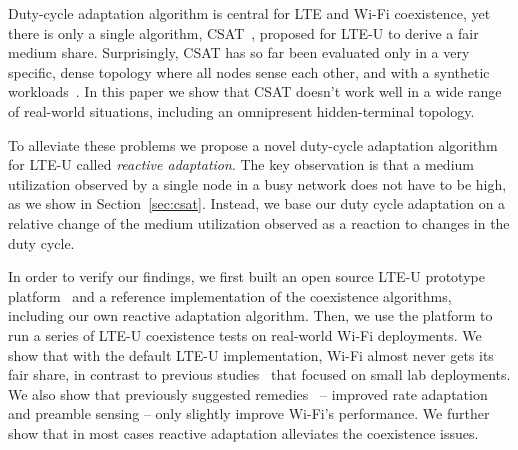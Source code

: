 Duty-cycle adaptation algorithm is central for LTE and Wi-Fi coexistence, yet there is only a single algorithm, CSAT~\cite{lteuforum_csat}, proposed for LTE-U to derive a fair medium share.
Surprisingly, CSAT has so far been evaluated only in a very specific, dense topology where all nodes sense each other, and with a synthetic workloads~\cite{qualcommpresentation}. In this paper we show that CSAT doesn't work well in a wide range of real-world situations, including an omnipresent hidden-terminal topology. 

To alleviate these problems we propose a novel duty-cycle adaptation algorithm for LTE-U called {\em reactive adaptation}. The key observation is that a medium utilization observed by a single node in a busy network does not have to be high, as we show in Section~\ref{sec:csat}. Instead, we base our duty cycle adaptation on a relative change of the medium utilization observed as a reaction to changes in the duty cycle. 

In order to verify our findings, we first built an open source LTE-U prototype platform~\cite{OpenLTEU} and a reference implementation of the coexistence algorithms, including our own reactive adaptation algorithm. 
Then, we use the platform to run a series of LTE-U coexistence tests on real-world Wi-Fi deployments. 
We show that with the default LTE-U implementation, Wi-Fi almost never gets its fair share, in contrast to previous studies~\cite{qualcommpresentation} that focused on small lab deployments. 
We also show that previously suggested remedies~\cite{google, cablelabs} -- improved rate adaptation and preamble sensing -- only slightly improve Wi-Fi's performance. 
We further show that in most cases reactive adaptation alleviates the coexistence issues. 



